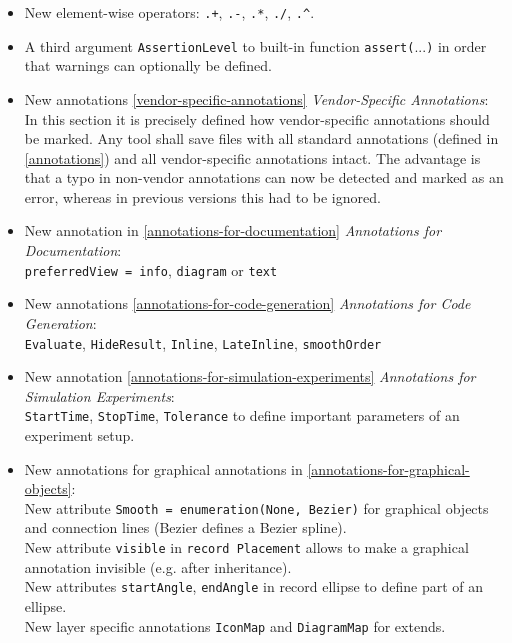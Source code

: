\begin{itemize}
\item
  New element-wise operators: \lstinline!.+!, \lstinline!.-!, \lstinline!.*!, \lstinline!./!, \lstinline!.^!.
\item
  A third argument \lstinline!AssertionLevel! to built-in function \lstinline!assert(!...\lstinline!)! in
  order that warnings can optionally be defined.
\item
  New annotations \autoref{vendor-specific-annotations} \emph{Vendor-Specific Annotations}:\\
  In this section it is precisely defined how vendor-specific
  annotations should be marked. Any tool shall save files with all
  standard annotations (defined in \autoref{annotations}) and all vendor-specific
  annotations intact. The advantage is that a typo in non-vendor
  annotations can now be detected and marked as an error, whereas in
  previous versions this had to be ignored.
\item
  New annotation in \autoref{annotations-for-documentation} \emph{Annotations for Documentation}:\\
  \lstinline!preferredView = info!, \lstinline!diagram! or \lstinline!text!
\item
  New annotations \autoref{annotations-for-code-generation} \emph{Annotations for Code Generation}:\\
  \lstinline!Evaluate!, \lstinline!HideResult!, \lstinline!Inline!,
	\lstinline!LateInline!, \lstinline!smoothOrder!
\item
  New annotation \autoref{annotations-for-simulation-experiments} \emph{Annotations for Simulation
  Experiments}:\\
  \lstinline!StartTime!, \lstinline!StopTime!, \lstinline!Tolerance! to define important parameters of an
  experiment setup.
\item
  New annotations for graphical annotations in \autoref{annotations-for-graphical-objects}:\\
  New attribute \lstinline!Smooth = enumeration(None, Bezier)! for graphical objects
  and connection lines (Bezier defines a Bezier spline).\\
  New attribute \lstinline!visible! in \lstinline!record Placement! allows to make a graphical
  annotation invisible (e.g. after inheritance).\\
  New attributes \lstinline!startAngle!, \lstinline!endAngle! in record ellipse to define part
  of an ellipse.\\
  New layer specific annotations \lstinline!IconMap! and \lstinline!DiagramMap! for extends.\\

\end{itemize}
